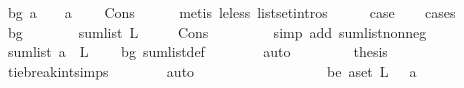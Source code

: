 \begin{isabellebody}
\ {\isacharparenleft}{\kern0pt}bg{\isacharparenright}{\kern0pt}\ {\isachardoublequoteopen}a{}\ {\isachargreater}{\kern0pt}\ {}{\isachardoublequoteclose}\ {\isacharbar}{\kern0pt}\ {\isachardoublequoteopen}a{}\ {\isacharequal}{\kern0pt}\ {}{\isachardoublequoteclose}\ \isamarkupfalse%
\ Cons\isanewline
\ \ \ \ \isamarkupfalse%
\ {\isacharparenleft}{\kern0pt}metis\ le{\isacharunderscore}{\kern0pt}less\ list{\isachardot}{\kern0pt}set{\isacharunderscore}{\kern0pt}intros{\isacharparenleft}{\kern0pt}{}{\isacharparenright}{\kern0pt}{\isacharparenright}{\kern0pt}\isanewline
\ \ \isamarkupfalse%
\ \isamarkupfalse%
\ {\isacharquery}{\kern0pt}case\ \isanewline
\ \ \isamarkupfalse%
{\isacharparenleft}{\kern0pt}cases{\isacharparenright}{\kern0pt}\isanewline
\ \ \ \ \isamarkupfalse%
\ bg\isanewline
\ \ \ \ \isamarkupfalse%
\ \isamarkupfalse%
\ {\isachardoublequoteopen}sum{\isacharunderscore}{\kern0pt}list\ L\ {\isasymge}\ {}\ {\isachardoublequoteclose}\ \isamarkupfalse%
\ Cons\ \isanewline
\ \ \ \ \ \ \isamarkupfalse%
\ {\isacharparenleft}{\kern0pt}simp\ add{\isacharcolon}{\kern0pt}\ sum{\isacharunderscore}{\kern0pt}list{\isacharunderscore}{\kern0pt}nonneg{\isacharparenright}{\kern0pt}\isanewline
\ \ \ \ \isamarkupfalse%
\ \isamarkupfalse%
\ {\isachardoublequoteopen}sum{\isacharunderscore}{\kern0pt}list\ {\isacharparenleft}{\kern0pt}a{}\ {\isacharhash}{\kern0pt}\ L{\isacharparenright}{\kern0pt}\ {\isachargreater}{\kern0pt}\ {}{\isachardoublequoteclose}\ \isamarkupfalse%
\ bg\ sum{\isacharunderscore}{\kern0pt}list{\isacharunderscore}{\kern0pt}def\isanewline
\ \ \ \ \ \ \isamarkupfalse%
\ auto\ \isanewline
\ \ \ \ \isamarkupfalse%
\ \isamarkupfalse%
\ {\isacharquery}{\kern0pt}thesis\ \isamarkupfalse%
\ tie{\isacharunderscore}{\kern0pt}break{\isacharunderscore}{\kern0pt}int{\isachardot}{\kern0pt}simps\isanewline
\ \ \ \ \ \ \isamarkupfalse%
\ auto\ \isanewline
\ \ \isamarkupfalse%
\isanewline
\ \ \ \ \isamarkupfalse%
\ {}\isanewline
\ \ \ \ \isamarkupfalse%
\ \isamarkupfalse%
\ \ be{\isacharcolon}{\kern0pt}\ {\isachardoublequoteopen}{\isasymexists}a{\isasymin}set\ L{\isachardot}{\kern0pt}\ {}\ {\isacharless}{\kern0pt}\ a{\isachardoublequoteclose}\ \isamarkupfalse%

\end{isabellebody}
